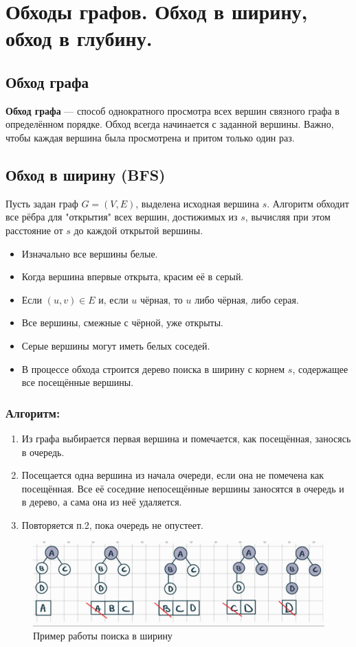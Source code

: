 \section{Обходы графов. Обход в ширину, обход в глубину. }

\subsection*{Обход графа}
\textbf{Обход графа} --- способ однократного просмотра всех вершин связного графа в определённом порядке. 
Обход всегда начинается с заданной вершины. 
Важно, чтобы каждая вершина была просмотрена и притом только один раз.

\subsection*{Обход в ширину (BFS)}
Пусть задан граф $G=(V,E)$, выделена исходная вершина $s$. 
Алгоритм обходит все рёбра для "открытия" всех вершин, достижимых из $s$, вычисляя при этом расстояние от $s$ до каждой открытой вершины.
\begin{itemize}
	\item Изначально все вершины белые.
	\item Когда вершина впервые открыта, красим её в серый.
	\item Если $(u,v) \in E$ и, если $u$ чёрная, то $u$ либо чёрная, либо серая.
	\item Все вершины, смежные с чёрной, уже открыты.
	\item Серые вершины могут иметь белых соседей.
	\item В процессе обхода строится дерево поиска в ширину с корнем $s$, содержащее все посещённые вершины.
\end{itemize}

\subsubsection*{Алгоритм:}
\begin{enumerate}
	\item Из графа выбирается первая вершина и помечается, как посещённая, заносясь в очередь.
	\item Посещается одна вершина из начала очереди, если она не помечена как посещённая. Все её соседние непосещённые вершины заносятся в очередь и в дерево, а сама она из неё удаляется.
	\item Повторяется п.2, пока очередь не опустеет.
\end{enumerate}
\begin{figure}[h!]
	\centering
	\includegraphics[width=0.6\linewidth]{img_easy/6_1.png}
	\captionsetup{labelformat=empty}
	\caption{Пример работы поиска в ширину}
	\label{fig:51}
\end{figure}

